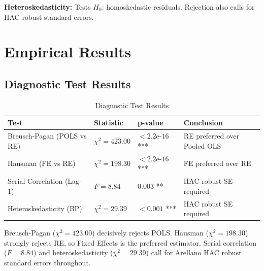 \documentclass[11pt,a4paper]{article}
\let\oldsection\section
\renewcommand{\section}{\Needspace{6\baselineskip}\oldsection}
\begin{document}
\textbf{Heteroskedasticity:} Tests $H_0$: homoskedastic residuals. Rejection also calls for HAC robust standard errors.

\clearpage
\section{Empirical Results}
\subsection{Diagnostic Test Results}
\begin{table}[H]
\caption{Diagnostic Test Results}
\centering\small
\begin{tabular}{|p{4.6cm}|p{2.2cm}|p{2.4cm}|p{4.2cm}|}
\hline
\textbf{Test} & \textbf{Statistic} & \textbf{p-value} & \textbf{Conclusion}\\\hline
Breusch-Pagan (POLS vs RE) & $\chi^2=423.00$ & $<2.2\text{e-}16$ *** & RE preferred over Pooled OLS\\\hline
Hausman (FE vs RE) & $\chi^2=198.30$ & $<2.2\text{e-}16$ *** & FE preferred over RE\\\hline
Serial Correlation (Lag-1) & $F=8.84$ & 0.003 ** & HAC robust SE required\\\hline
Heteroskedasticity (BP) & $\chi^2=29.39$ & $<0.001$ *** & HAC robust SE required\\\hline
\end{tabular}
\end{table}

Breusch-Pagan ($\chi^2=423.00$) decisively rejects POLS. Hausman ($\chi^2=198.30$) strongly rejects RE, so Fixed Effects is the preferred estimator. Serial correlation ($F=8.84$) and heteroskedasticity ($\chi^2=29.39$) call for Arellano HAC robust standard errors throughout.
\end{document}
